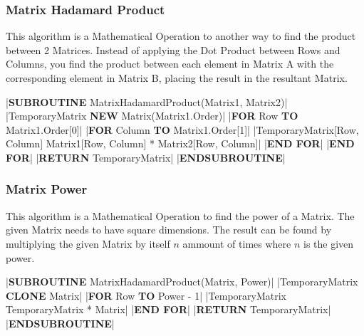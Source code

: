\begin{flushleft}
                \vspace{0.5cm}
            \subsubsection{Matrix Hadamard Product}
                This algorithm is a Mathematical Operation to another way to find the product between 2 Matrices. Instead of
                applying the Dot Product between Rows and Columns, you find the product between each element in Matrix A
                with the corresponding element in Matrix B, placing the result in the resultant Matrix.

                \vspace{0.2cm}
                \begin{pseudocode}
|\textbf{SUBROUTINE} MatrixHadamardProduct(Matrix1, Matrix2)|
    |TemporaryMatrix \leftarrow \textbf{NEW} Matrix(Matrix1.Order)|
    |\textbf{FOR} Row  \textbf{TO} Matrix1.Order[0]|
        |\textbf{FOR} Column  \textbf{TO} Matrix1.Order[1]|
            |TemporaryMatrix[Row, Column] \leftarrow Matrix1[Row, Column] * Matrix2[Row, Column]|
        |\textbf{END FOR}|
    |\textbf{END FOR}|
    |\textbf{RETURN} TemporaryMatrix|
|\textbf{ENDSUBROUTINE}|
                \end{pseudocode}   

                \vspace{0.5cm}
            \subsubsection{Matrix Power}
                This algorithm is a Mathematical Operation to find the power of a Matrix. The given Matrix needs to have square dimensions.
                The result can be found by multiplying the given Matrix by itself $n$ ammount of times where $n$ is the given power.
                
                \vspace{0.2cm}
                \begin{pseudocode}
|\textbf{SUBROUTINE} MatrixHadamardProduct(Matrix, Power)|
    |TemporaryMatrix \leftarrow \textbf{CLONE} Matrix|
    |\textbf{FOR} Row  \textbf{TO} Power - 1|
        |TemporaryMatrix \leftarrow TemporaryMatrix * Matrix|
    |\textbf{END FOR}|
    |\textbf{RETURN} TemporaryMatrix|
|\textbf{ENDSUBROUTINE}|
                \end{pseudocode}  

                \vspace{0.5cm}

\end{flushleft}
